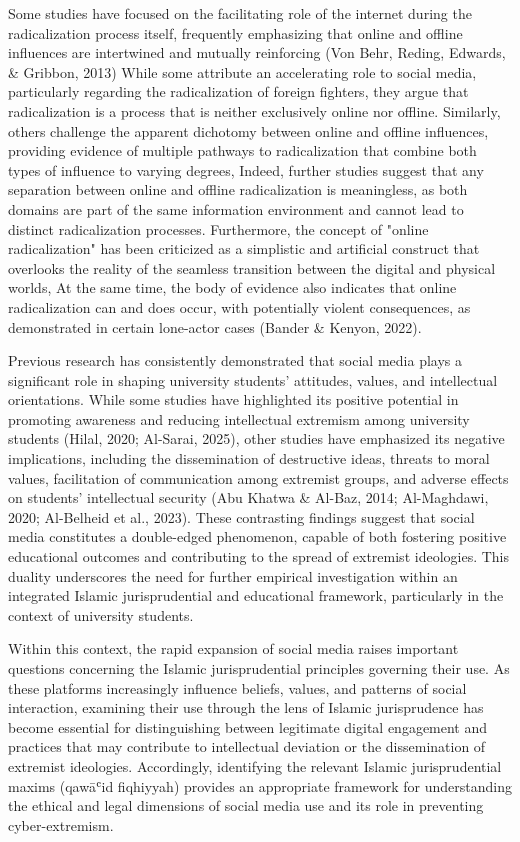 \documentclass[10pt]{NSP1}
\begin{document}
Some studies have focused on the facilitating role of the internet during the radicalization process itself, frequently emphasizing that online and offline influences are intertwined and mutually reinforcing (Von Behr, Reding, Edwards, \& Gribbon, 2013) While some attribute an accelerating role to social media, particularly regarding the radicalization of foreign fighters, they argue that radicalization is a process that is neither exclusively online nor offline. Similarly, others challenge the apparent dichotomy between online and offline influences, providing evidence of multiple pathways to radicalization that combine both types of influence to varying degrees, Indeed, further studies suggest that any separation between online and offline radicalization is meaningless, as both domains are part of the same information environment and cannot lead to distinct radicalization processes. Furthermore, the concept of "online radicalization" has been criticized as a simplistic and artificial construct that overlooks the reality of the seamless transition between the digital and physical worlds, At the same time, the body of evidence also indicates that online radicalization can and does occur, with potentially violent consequences, as demonstrated in certain lone-actor cases (Bander \& Kenyon, 2022).

Previous research has consistently demonstrated that social media plays a significant role in shaping university students' attitudes, values, and intellectual orientations. While some studies have highlighted its positive potential in promoting awareness and reducing intellectual extremism among university students (Hilal, 2020; Al-Sarai, 2025), other studies have emphasized its negative implications, including the dissemination of destructive ideas, threats to moral values, facilitation of communication among extremist groups, and adverse effects on students' intellectual security (Abu Khatwa \& Al-Baz, 2014; Al-Maghdawi, 2020; Al-Belheid et al., 2023). These contrasting findings suggest that social media constitutes a double-edged phenomenon, capable of both fostering positive educational outcomes and contributing to the spread of extremist ideologies. This duality underscores the need for further empirical investigation within an integrated Islamic jurisprudential and educational framework, particularly in the context of university students.

Within this context, the rapid expansion of social media raises important questions concerning the Islamic jurisprudential principles governing their use. As these platforms increasingly influence beliefs, values, and patterns of social interaction, examining their use through the lens of Islamic jurisprudence has become essential for distinguishing between legitimate digital engagement and practices that may contribute to intellectual deviation or the dissemination of extremist ideologies. Accordingly, identifying the relevant Islamic jurisprudential maxims (qawāʿid fiqhiyyah) provides an appropriate framework for understanding the ethical and legal dimensions of social media use and its role in preventing cyber-extremism.
\end{document}
